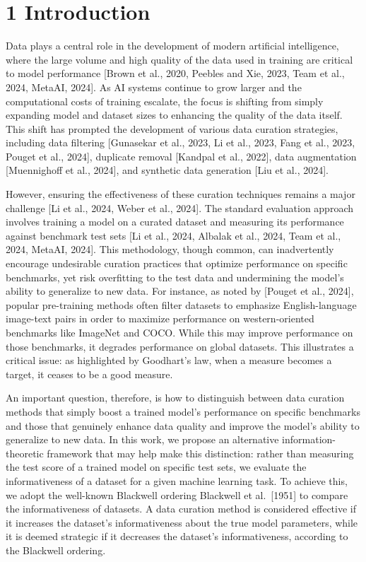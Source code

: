 \section{1 Introduction}\label{introduction}

Data plays a central role in the development of modern artificial
intelligence, where the large volume and high quality of the data used
in training are critical to model performance {[}Brown et al., 2020,
Peebles and Xie, 2023, Team et al., 2024, MetaAI, 2024{]}. As AI systems
continue to grow larger and the computational costs of training
escalate, the focus is shifting from simply expanding model and dataset
sizes to enhancing the quality of the data itself. This shift has
prompted the development of various data curation strategies, including
data filtering {[}Gunasekar et al., 2023, Li et al., 2023, Fang et al.,
2023, Pouget et al., 2024{]}, duplicate removal {[}Kandpal et al.,
2022{]}, data augmentation {[}Muennighoff et al., 2024{]}, and synthetic
data generation {[}Liu et al., 2024{]}.

However, ensuring the effectiveness of these curation techniques remains
a major challenge {[}Li et al., 2024, Weber et al., 2024{]}. The
standard evaluation approach involves training a model on a curated
dataset and measuring its performance against benchmark test sets {[}Li
et al., 2024, Albalak et al., 2024, Team et al., 2024, MetaAI, 2024{]}.
This methodology, though common, can inadvertently encourage undesirable
curation practices that optimize performance on specific benchmarks, yet
risk overfitting to the test data and undermining the model's ability to
generalize to new data. For instance, as noted by {[}Pouget et al.,
2024{]}, popular pre-training methods often filter datasets to emphasize
English-language image-text pairs in order to maximize performance on
western-oriented benchmarks like ImageNet and COCO. While this may
improve performance on those benchmarks, it degrades performance on
global datasets. This illustrates a critical issue: as highlighted by
Goodhart's law, when a measure becomes a target, it ceases to be a good
measure.

An important question, therefore, is how to distinguish between data
curation methods that simply boost a trained model's performance on
specific benchmarks and those that genuinely enhance data quality and
improve the model's ability to generalize to new data. In this work, we
propose an alternative information-theoretic framework that may help
make this distinction: rather than measuring the test score of a trained
model on specific test sets, we evaluate the informativeness of a
dataset for a given machine learning task. To achieve this, we adopt the
well-known Blackwell ordering Blackwell et al.~{[}1951{]} to compare the
informativeness of datasets. A data curation method is considered
effective if it increases the dataset's informativeness about the true
model parameters, while it is deemed strategic if it decreases the
dataset's informativeness, according to the Blackwell ordering.


